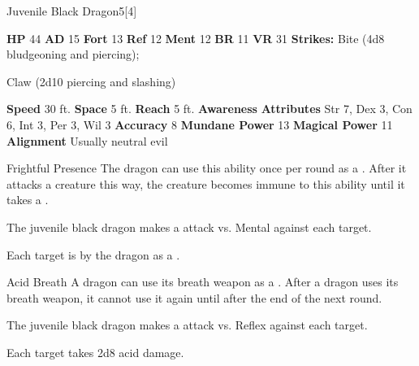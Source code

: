   \begin{monsubsection}{Juvenile Black Dragon}{5}[4]
    \vspace{-1em}\vspace{-1em}
    \vspace{0em}

    
    

    \begin{spellcontent}
      \begin{spelltargetinginfo}
        \pari \textbf{HP} 44 \monsep
          \textbf{AD} 15 \monsep
          \textbf{Fort} 13 \monsep
          \textbf{Ref} 12 \monsep
          \textbf{Ment} 12
        \pari \textbf{BR} 11 \monsep
        \textbf{VR} 31
        \pari \textbf{Strikes:}
            Bite  (4d8 bludgeoning and piercing);
\par Claw  (2d10 piercing and slashing)
      \end{spelltargetinginfo}
    \end{spellcontent}
    \begin{monsterfooter}
      \pari \textbf{Speed} 30 ft. \monsep
        \textbf{Space} 5 ft. \monsep
        \textbf{Reach} 5 ft.
      \pari \textbf{Awareness} 
      \pari \textbf{Attributes}
        Str 7, Dex 3,
        Con 6, Int 3,
        Per 3, Wil 3
      \pari \textbf{Accuracy} 8 \monsep
        \textbf{Mundane Power} 13 \monsep
      \textbf{Magical Power} 11
      \pari \textbf{Alignment} Usually neutral evil
    \end{monsterfooter}
  \end{monsubsection}
  \begin{freeability}{Frightful Presence}
      The dragon can use this ability once per round as a .
      After it attacks a creature this way, the creature becomes immune to this ability until it takes a .
      \par The juvenile black dragon makes a  attack
        vs. Mental against each target.
    
    \hit Each target is  by the dragon as a .
    \end{freeability}
  

    \begin{freeability}{Acid Breath}
      A dragon can use its breath weapon as a .
      After a dragon uses its breath weapon, it cannot use it again until after the end of the next round.
      \par The juvenile black dragon makes a  attack
        vs. Reflex against each target.
    
    \hit Each target takes 2d8 acid damage.
    \end{freeability}
  
